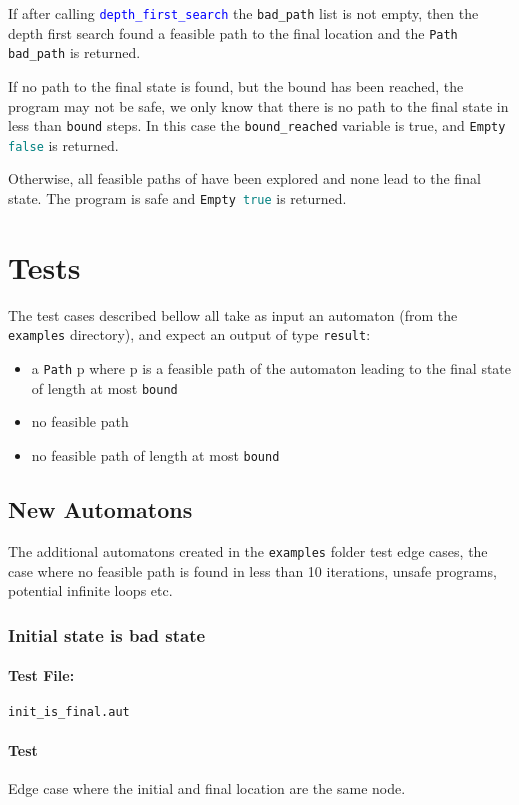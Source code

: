 \documentclass[letterpaper,12pt]{article}
\begin{document}
If after calling \texttt{\textcolor{blue}{depth\_first\_search}} the \texttt{bad\_path} list is not empty, then the depth first search found a feasible path to the final location and the \texttt{Path bad\_path} is returned.

If no path to the final state is found, but the bound has been reached, the program may not be safe, we only know that there is no path to the final state in less than \texttt{bound} steps. In this case the \texttt{bound\_reached} variable is true, and \texttt{Empty \textcolor{teal}{false}} is returned.

Otherwise, all feasible paths of have been explored and none lead to the final state. The program is safe and \texttt{Empty \textcolor{teal}{true}} is returned.


\section{Tests}
The test cases described bellow all take as input an automaton (from the \texttt{examples} directory), and expect an output of type \texttt{result}:
\begin{itemize}
\item a \texttt{Path} p where p is a feasible path of the automaton leading to the final state of length at most \texttt{bound}
\item no feasible path
\item no feasible path of length at most \texttt{bound}
\end{itemize}

\subsection{New Automatons}
The additional automatons created in the \texttt{examples} folder test edge cases, the case where no feasible path is found in less than 10 iterations, unsafe programs, potential infinite loops etc.

\subsubsection{Initial state is bad state}
\paragraph{Test File:} \texttt{init\_is\_final.aut}
\paragraph{Test}
Edge case where the initial and final location are the same node.
\end{document}
